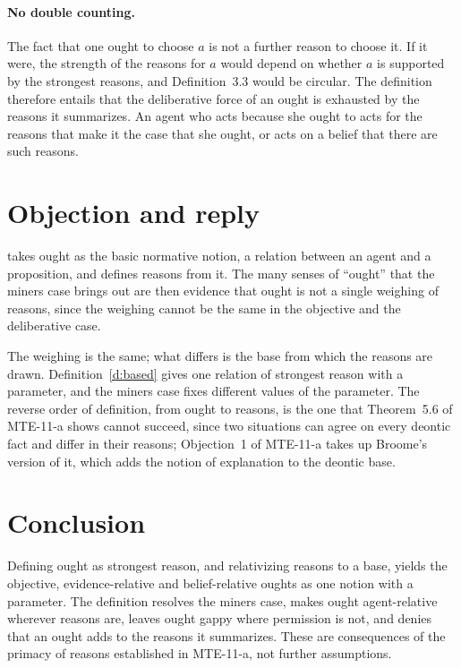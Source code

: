 \documentclass{situationist-preprint}
\begin{document}
\paragraph{No double counting.} The fact that one ought to choose $a$ is not a further reason to choose it. If it were, the strength of the reasons for $a$ would depend on whether $a$ is supported by the strongest reasons, and Definition~3.3 would be circular. The definition therefore entails that the deliberative force of an ought is exhausted by the reasons it summarizes. An agent who acts because she ought to acts for the reasons that make it the case that she ought, or acts on a belief that there are such reasons.

\section{Objection and reply}

\begin{objection}
\citet{Broome2013} takes ought as the basic normative notion, a relation between an agent and a proposition, and defines reasons from it. The many senses of \enquote{ought} that the miners case brings out are then evidence that ought is not a single weighing of reasons, since the weighing cannot be the same in the objective and the deliberative case.
\end{objection}

\begin{reply}
The weighing is the same; what differs is the base from which the reasons are drawn. Definition~\ref{d:based} gives one relation of strongest reason with a parameter, and the miners case fixes different values of the parameter. The reverse order of definition, from ought to reasons, is the one that Theorem~5.6 of MTE-11-a shows cannot succeed, since two situations can agree on every deontic fact and differ in their reasons; Objection~1 of MTE-11-a takes up Broome's version of it, which adds the notion of explanation to the deontic base.
\end{reply}

\section{Conclusion}

Defining ought as strongest reason, and relativizing reasons to a base, yields the objective, evidence-relative and belief-relative oughts as one notion with a parameter. The definition resolves the miners case, makes ought agent-relative wherever reasons are, leaves ought gappy where permission is not, and denies that an ought adds to the reasons it summarizes. These are consequences of the primacy of reasons established in MTE-11-a, not further assumptions.
\end{document}
